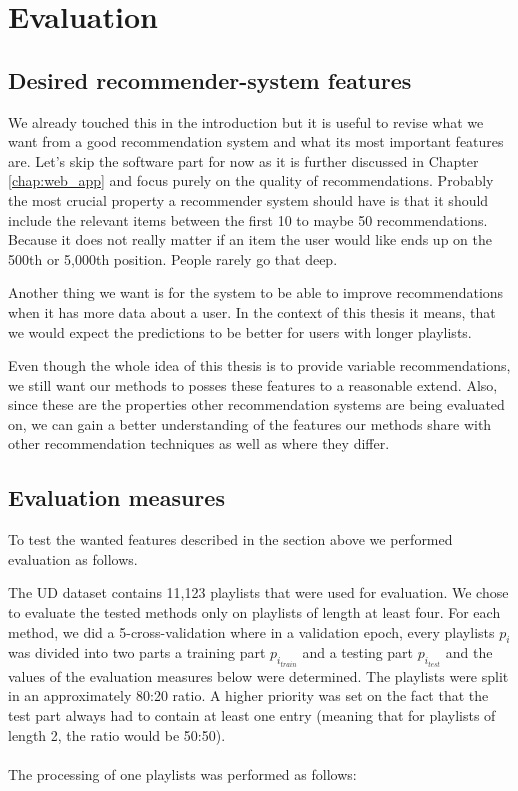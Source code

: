 \section{Evaluation}\label{sec:evaluation}

\subsection{Desired recommender-system features}
We already touched this in the introduction but it is useful to revise what we want from a good recommendation system and what its most important features are. Let's skip the software part for now as it is further discussed in Chapter \ref{chap:web_app} and focus purely on the quality of recommendations. Probably the most crucial property a recommender system should have is that it should include the relevant items between the first 10 to maybe 50 recommendations. Because it does not really matter if an item the user would like ends up on the 500th or 5,000th position. People rarely go that deep. 

Another thing we want is for the system to be able to improve recommendations when it has more data about a user. In the context of this thesis it means, that we would expect the predictions to be better for users with longer playlists. 

Even though the whole idea of this thesis is to provide variable recommendations, we still want our methods to posses these features to a reasonable extend. Also, since these are the properties other recommendation systems are being evaluated on, we can gain a better understanding of the features our methods share with other recommendation techniques as well as where they differ. 

\subsection{Evaluation measures}\label{ssec:evaluation_measures}
To test the wanted features described in the section above we performed evaluation as follows. 

The UD dataset contains 11,123 playlists that were used for evaluation. We chose to evaluate the tested methods only on playlists of length at least four. For each method, we did a 5-cross-validation where in a validation epoch, every playlists $p_i$ was divided into two parts a training part $p_{i_{train}}$ and a testing part $p_{i_{test}}$ and the values of the evaluation measures below were determined. The playlists were split in an approximately 80:20 ratio. A higher priority was set on the fact that the test part always had to contain at least one entry (meaning that for playlists of length 2, the ratio would be 50:50). \\ \\
The processing of one playlists was performed as follows: 

